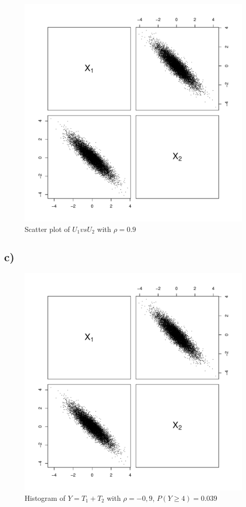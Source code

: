 \documentclass[a4paper, 11pt]{article}
\begin{document}
\begin{figure}[H]
  \centering
  \includegraphics[scale=0.7,page=6]{Rplots4.pdf}
  \caption{Scatter plot of $U_1 vs U_2$ with $\rho = 0.9$}
  \label{u1u2pos}
\end{figure}


\subsection{c)}

\begin{figure}[H]
  \centering
  \includegraphics[scale=0.7,page=7]{Rplots4.pdf}
  \caption{Histogram of $Y=T_1 + T_2$ with $\rho = -0,9$, $P(Y\geq4) = 0.039$}
  \label{ygekroneg}
\end{figure}
\end{document}
